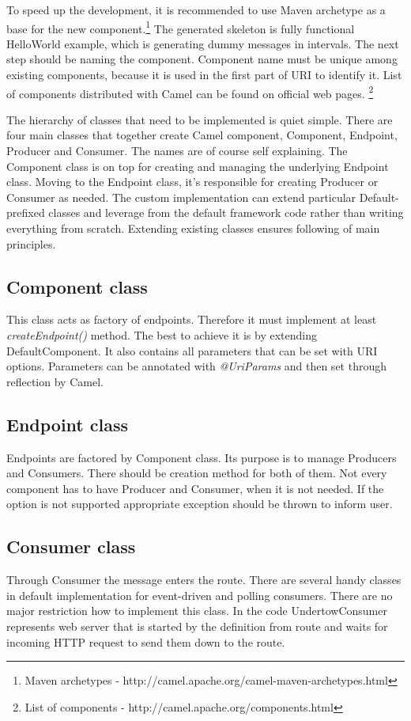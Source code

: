 \documentclass[12pt,final,oneside]{fithesis2}
\begin{document}
 To speed up the development, it is recommended to use Maven archetype as a base for the new component.\footnote{Maven archetypes - http://camel.apache.org/camel-maven-archetypes.html} The generated skeleton is fully functional HelloWorld example, which is generating dummy messages in intervals. The next step should be naming the component. Component name must be unique among existing components, because it is used in the first part of URI to identify it. List of components distributed with Camel can be found on official web pages. \footnote{List of components - http://camel.apache.org/components.html}
 
 The hierarchy of classes that need to be implemented is quiet simple. There are four main classes that together create Camel component, Component, Endpoint, Producer and Consumer. The names are of course self explaining. The Component class is on top for creating and managing the underlying Endpoint class. Moving to the Endpoint class, it's responsible for creating Producer or Consumer as needed. The custom implementation can extend particular Default-prefixed classes and leverage from the default framework code rather than writing everything from scratch. Extending existing classes ensures following of main principles.
 
\subsection*{Component class}
This class acts as factory of endpoints. Therefore it must implement at least \textit{createEndpoint()} method. The best to achieve it is by extending DefaultComponent. It also contains all parameters that can be set with URI options. Parameters can be annotated with \textit{@UriParams} and then set through reflection by Camel.

 \subsection*{Endpoint class}
 Endpoints are factored by Component class. Its purpose is to manage Producers and Consumers. There should be creation method for both of them. Not every component has to have Producer and Consumer, when it is not needed. If the option is not supported appropriate exception should be thrown to inform user.
 
 \subsection*{Consumer class}
 Through Consumer the message enters the route. There are several handy classes in default implementation for event-driven and polling consumers. There are no major restriction how to implement this class. In the code UndertowConsumer represents web server that is started by the definition from route and waits for incoming HTTP request to send them down to the route. 
 
\end{document}
